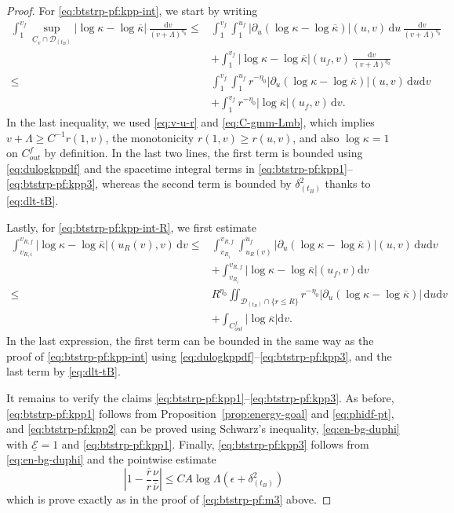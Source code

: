 \documentclass[10pt, reqno]{amsart}
\theoremstyle{definition}
\theoremstyle{remark}
\theoremstyle{conjecture}
\numberwithin{equation}{section}
\newcommand{\set}[1]{\{#1\}}
\newcommand{\ud}{\mathrm{d}}
\newcommand{\rd}{\partial}
\newcommand{\0}{\emptyset}
\newcommand{\dlt}{\delta}
\newcommand{\eps}{\epsilon}
\newcommand{\kpp}{\kappa}
\newcommand{\lmb}{\lambda}
\newcommand{\Lmb}{\Lambda}
\newcommand{\calD}{\mathcal D}
\newcommand{\calE}{\mathcal E}
\newcommand{\uC}{\underline{C}}
\newcommand{\dur}{\nu}
\newcommand{\dvr}{\lmb}
\newcommand{\durbg}{\overline{\dur}}				%
\newcommand{\rbg}{\overline{r}}					%
\newcommand{\kppbg}{\overline{\kpp}}					%
\newcommand{\Abs}[1]{\left\vert #1 \right\vert}
\begin{document}
\begin{proof}
For \eqref{eq:btstrp-pf:kpp-int}, we start by writing
\begin{align*}
\int_{1}^{v_{f}} \sup_{\uC_{v} \cap \calD_{(t_{B})}} \Abs{\log \kpp - \log \kppbg} \, \frac{\ud v}{(v + \Lmb)^{\eta_{0}}}
\leq	& \int_{1}^{v_{f}} \int_{1}^{u_{f}} \Abs{\rd_{u} (\log \kpp - \log \kppbg)} (u, v) \, \ud u \, \frac{\ud v}{(v + \Lmb)^{\eta_{0}}} \\
	&  + \int_{1}^{v_{f}} \Abs{\log \kpp - \log \kppbg}(u_{f}, v) \, \frac{\ud v}{(v + \Lmb)^{\eta_{0}}} \\
\leq	& \int_{1}^{v_{f}} \int_{1}^{u_{f}} r^{-\eta_{0}} \Abs{\rd_{u} (\log \kpp - \log \kppbg)} (u, v) \, \ud u \ud v \\
	&  + \int_{1}^{v_{f}} r^{-\eta_{0}} \Abs{\log \kppbg}(u_{f}, v) \, \ud v.
\end{align*}
In the last inequality, we used \eqref{eq:v-u-r} and \eqref{eq:C-gmm-Lmb}, which implies $v + \Lmb \geq C^{-1} r(1, v)$, the monotonicity $r(1, v) \geq r(u, v)$, and also $\log\kpp=1$ on $C_{out}^f$ by definition. In the last two lines, the first term is bounded using \eqref{eq:dulogkppdf} and the spacetime integral terms in \eqref{eq:btstrp-pf:kpp1}--\eqref{eq:btstrp-pf:kpp3}, whereas the second term is bounded by $\dlt_{(t_{B})}^{2}$ thanks to \eqref{eq:dlt-tB}.

Lastly, for \eqref{eq:btstrp-pf:kpp-int-R}, we first estimate
\begin{align*}
\int_{v_{R, i}}^{v_{R, f}} \Abs{\log \kpp - \log \kppbg}(u_{R}(v), v) \, \ud v
\leq & \int_{v_{R_{i}}}^{v_{R, f}} \int_{u_{R}(v)}^{u_{f}} \Abs{\rd_{u} (\log \kpp - \log \kppbg)}(u, v) \, \ud u \ud v \\
& + \int_{v_{R_{i}}}^{v_{R, f}} \Abs{\log \kpp - \log \kppbg}(u_{f}, v)  \ud v \\
\leq & R^{\eta_{0}} \iint_{\calD_{(t_{B})} \cap \set{r \leq R}} r^{-\eta_{0}} \Abs{\rd_{u} (\log \kpp - \log \kppbg)} \, \ud u \ud v \\
& + \int_{C_{out}^{f}} \Abs{\log \kppbg}  \ud v.
\end{align*}
In the last expression, the first term can be bounded in the same way as the proof of \eqref{eq:btstrp-pf:kpp-int} using \eqref{eq:dulogkppdf}--\eqref{eq:btstrp-pf:kpp3}, and the last term by \eqref{eq:dlt-tB}.

It remains to verify the claims \eqref{eq:btstrp-pf:kpp1}--\eqref{eq:btstrp-pf:kpp3}. As before, \eqref{eq:btstrp-pf:kpp1} follows from Proposition~\ref{prop:energy-goal} and \eqref{eq:phidf-pt}, and \eqref{eq:btstrp-pf:kpp2} can be proved using Schwarz's inequality, \eqref{eq:en-bg-duphi} with $\underline{\calE} = 1$ and \eqref{eq:btstrp-pf:kpp1}. Finally, \eqref{eq:btstrp-pf:kpp3} follows from \eqref{eq:en-bg-duphi} and the pointwise estimate
\begin{equation*}
	\Abs{1 - \frac{\rbg}{r} \frac{\dur}{\durbg}} \leq C A \log \Lmb \left( \eps + \dlt_{(t_{B})}^{2} \right)
\end{equation*}
which is prove exactly as in the proof of \eqref{eq:btstrp-pf:m3} above. \qedhere
\end{proof}
\end{document}
